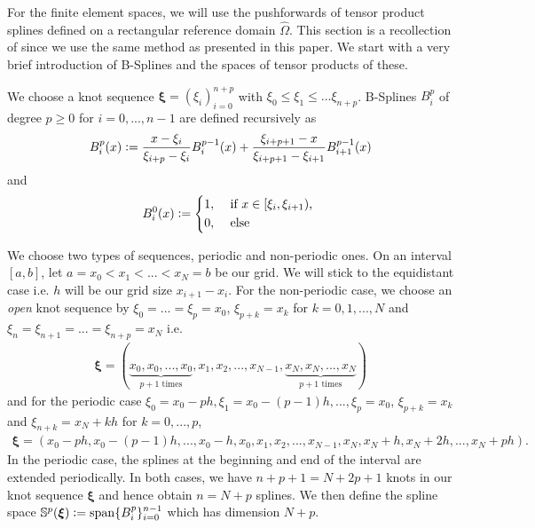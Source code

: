 \documentclass[../master_thesis.tex]{subfiles}
\begin{document}
For the finite element spaces, we will use the pushforwards of tensor product splines 
defined on a rectangular reference domain $\hat{\Omega}$. This section is a recollection 
of \cite[Sec. 4.2]{multipatch_paper} 
since we use the same method as presented in this paper.  
We start with a very brief introduction of B-Splines and the spaces of tensor products 
of these.

We choose a knot sequence $\bm{\xi} = (\xi_i )_{i=0}^{n+p}$ with 
$\xi_0 \leq \xi_1 \leq ... \xi_{n+p}$. 
B-Splines $B^p_i$ of degree $p\geq 0$ for $i = 0,...,n-1$ are defined recursively as 
\begin{align*}
    B^p_{i}(x) \vcentcolon= \frac{x - \xi_i}{\xi_{i+p}- \xi_i} B_i^{p-1}(x) 
        + \frac{\xi_{i+p+1} - x}{\xi_{i+p+1}- \xi_{i+1}} B_{i+1}^{p-1}(x) 
\end{align*}
and 
\begin{align*}
    B^0_i(x) \vcentcolon= \begin{cases*}
        1, & \text{ if $x \in [\xi_i,\xi_{i+1})$},
        \\0, & \text{ else}
    \end{cases*}
\end{align*}

We choose two types of sequences, periodic and non-periodic ones.
On an interval $[a,b]$, 
let $a= x_0 < x_1 < ... < x_N = b$ be our grid. 
We will stick to the equidistant case i.e. $h$ will be our grid size 
$x_{i+1} - x_i$.
For the non-periodic case, we choose an \textit{open} knot sequence by 
$\xi_0 = ... = \xi_p = x_0$, $\xi_{p+k} = x_k$ for $k = 0,1,...,N$ and 
$\xi_{n} = \xi_{n+1} = ... = \xi_{n+p} = x_N$ i.e. 
\begin{align*}
    \bm{\xi} = (\underbrace{x_0, x_0,...,x_0}_{\text{$p+1$ times}}, x_1, x_2, ..., x_{N-1}, 
        \underbrace{x_N, x_N, ..., x_N}_{\text{$p+1$ times}})   
\end{align*}
and for the periodic case 
$\xi_0 = x_0-ph, \xi_1 = x_0-(p-1)h, ..., \xi_p = x_0$,
$\xi_{p+k} = x_k$ and $\xi_{n+k} = x_N + kh$ for $k = 0, ..., p$, 
\begin{align*}
    \bm{\xi} = (x_0-ph,x_0-(p-1)h,...,x_0-h, x_0,  x_1, x_2, ..., x_{N-1}, 
        x_N, x_N + h, x_N + 2h, ..., x_N + ph ).
\end{align*}
In the periodic case, the splines at the beginning and end of the interval are extended periodically.
In both cases, we have $n + p +1 = N+2p+1$ knots in our knot sequence $\bm{\xi}$ and
hence obtain $n = N + p$ splines.
We then define the spline space $\mathbb{S}^p(\bm{\xi}) \vcentcolon= \operatorname{span} \{ B_i^p \}_{i=0}^{n-1}$
which has dimension $N+p$.
\end{document}
